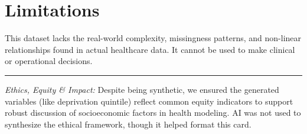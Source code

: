 \documentclass[
]{report}
\begin{document}
\chapter{Limitations}\label{limitations}

This dataset lacks the real-world complexity, missingness patterns, and
non-linear relationships found in actual healthcare data. It cannot be
used to make clinical or operational decisions.

\begin{center}\rule{0.5\linewidth}{0.5pt}\end{center}

\begin{tcolorbox}[enhanced jigsaw, opacityback=0, colbacktitle=quarto-callout-note-color!10!white, toptitle=1mm, colframe=quarto-callout-note-color-frame, rightrule=.15mm, title=\textcolor{quarto-callout-note-color}{\faInfo}\hspace{0.5em}{AI Capability Checkpoint}, left=2mm, bottomrule=.15mm, arc=.35mm, breakable, coltitle=black, colback=white, opacitybacktitle=0.6, bottomtitle=1mm, titlerule=0mm, toprule=.15mm, leftrule=.75mm]

\emph{Ethics, Equity \& Impact:} Despite being synthetic, we ensured the
generated variables (like deprivation quintile) reflect common equity
indicators to support robust discussion of socioeconomic factors in
health modeling. AI was not used to synthesize the ethical framework,
though it helped format this card.

\end{tcolorbox}
\end{document}
